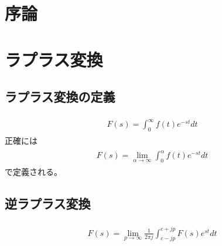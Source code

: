 \chapter{序論}
\chapter{ラプラス変換}
\section{ラプラス変換の定義}
\begin{Definition}[ラプラス変換]
\begin{align}
\begin{split}
F(s) = \int_{0}^{\infty} f (t) e^{-st} dt
\end{split}
\end{align}
正確には
\begin{align}
\begin{split}
F(s) = \lim_{\alpha \to \infty} \int_{0}^{\alpha} f (t) e^{-st} dt
\end{split}
\end{align}
で定義される。
\end{Definition}

\section{逆ラプラス変換}

\begin{Definition}[ブロムウィッチ積分]
\begin{align}
\begin{split}
F(s) = \lim_{p \to \infty} \frac{1}{2 \pi j} \int_{c-jp}^{c+jp} F (s) e^{st} dt
\end{split}
\end{align}
\end{Definition}

